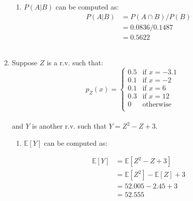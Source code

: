 \documentclass{article}
\begin{document}
\begin{enumerate}
\begin{enumerate}
        \item $P(A|B)$ can be computed as:
            \begin{equation}
            \begin{split}
                P(A|B) &= P(A \cap B) / P(B)\\
                &= 0.0836 / 0.1487\\
                &= 0.5622
            \end{split}
            \end{equation}\\
    \end{enumerate}
    
    \item Suppose $Z$ is a r.v. such that:
    \begin{equation} \nonumber
        p_Z(x) = 
            \begin{cases}
                0.5 & \text{if } x = -3.1\\
                0.1 & \text{if } x = -2\\
                0.1 & \text{if } x = 6\\
                0.3 & \text{if } x = 12\\
                0 & \text{otherwise}\\
            \end{cases}
    \end{equation}\\

    and $Y$ is another r.v. such that $Y = Z^{2} - Z + 3$.\\

    \begin{enumerate}

        \item $\mathbb{E}{[Y]}$ can be computed as:

        \begin{equation}
        \begin{split}
            \mathbb{E}{[Y]} &= \mathbb{E}{[Z^2 - Z + 3]}\\
            &= \mathbb{E}{[Z^2]} - \mathbb{E}{[Z]} + 3\\
            &= 52.005 - 2.45 + 3\\
            &= 52.555
        \end{split}
        \end{equation}


\end{enumerate}
\end{enumerate}
\end{document}
